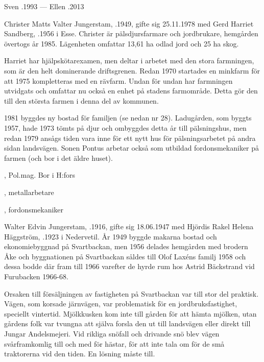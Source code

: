 Sven .1993  ---  Ellen .2013




Christer Matts Valter Jungerstam, .1949, gifte sig 25.11.1978 med Gerd Harriet Sandberg, .1956 i Esse. Christer är pälsdjursfarmare och jordbrukare, hemgården övertogs år 1985. Lägenheten omfattar 13,61 ha odlad jord och 25 ha skog.

Harriet har hjälpskötarexamen, men deltar i arbetet med den stora farmningen, som är den helt dominerande driftsgrenen. Redan 1970 startades en minkfarm för att 1975 kompletteras med en rävfarm. Undan för undan har farmningen utvidgats och omfattar nu också en enhet på stadens farmområde. Detta gör den till den största farmen i denna del av kommunen.


1981 byggdes ny bostad för familjen (se nedan nr 28). Ladugården, som byggts 1957, hade 1973 tömts på djur och ombyggdes detta år till pälsningshus, men redan 1979 ansågs tiden vara inne för ett nytt hus för pälsningsarbetet på andra sidan landsvägen. Sonen Pontus arbetar också som utbildad fordonsmekaniker på farmen (och bor i det äldre huset).
\begin{jhchildren}
  \item {}, Pol.mag. Bor i H:fors
  \item {}, metallarbetare
  \item {}, fordonsmekaniker
\end{jhchildren}


Walter Edvin Jungerstam, .1916, gifte sig 18.06.1947 med Hjördis Rakel Helena Häggström, .1923 i Nedervetil. År 1949 byggde makarna bostad och ekonomiebyggnad på Svartbackan, men 1956 delades hemgården med brodern Åke och byggnationen på Svartbackan såldes till Olof Laxéns familj 1958 och dessa bodde där fram till 1966 varefter de hyrde rum hos Astrid Bäckstrand vid Furubacken 1966-68.

Orsaken till försäljningen av fastigheten på Svartbackan var till stor del praktisk. Vägen, som korsade järnvägen, var problematisk för en jordbruksfastighet, speciellt vintertid. Mjölkkusken kom inte till gården för att hämta mjölken, utan gårdens folk var tvungna att själva forsla den ut till landsvägen eller direkt till Jungar Andelsmejeri. Vid rikliga snöfall och drivande snö blev vägen svårframkomlig till och med för hästar, för att inte tala om för de små traktorerna vid den tiden. En lösning måste till.

